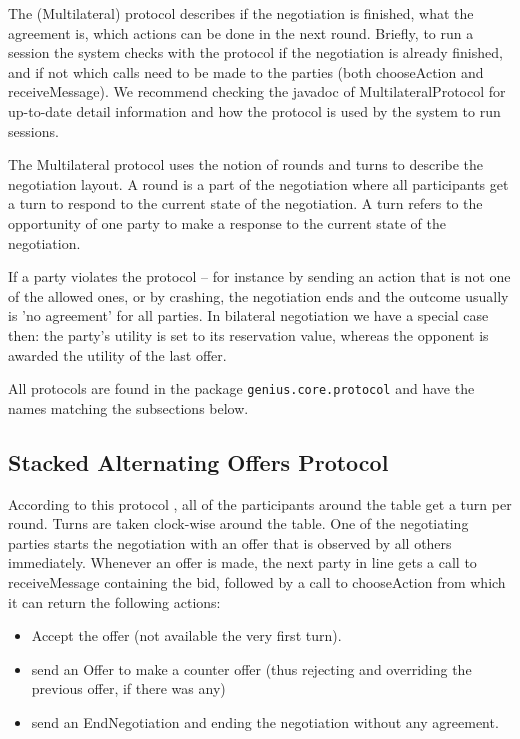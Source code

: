 \documentclass[]{article}
\begin{document}
  The (Multilateral)  protocol describes if the negotiation is finished, what the agreement is, which actions can be done in the next round.   Briefly, to run a session the system checks with the protocol if the negotiation is already finished,  and if not which calls need to be made to the parties (both chooseAction and receiveMessage).  We recommend checking the javadoc of MultilateralProtocol for up-to-date detail information and how the protocol is used by the system to run sessions.
  
 The Multilateral protocol uses the notion of rounds and turns to describe the negotiation layout. A round is a part of the negotiation where all participants get a turn to respond to the current state of the negotiation. A turn refers to the opportunity of one party to make a response to the current state of the negotiation. 
  
If a party violates the protocol -- for instance by sending an action that is not one of the allowed ones, or by crashing, the negotiation ends and the outcome usually is 'no agreement' for all parties.  In bilateral negotiation we have a special case then: the party's utility is set to its reservation value, whereas the opponent is awarded the utility of the last offer.

All protocols are found in the package \verb|genius.core.protocol| and have the names matching the subsections below.


\subsection{Stacked Alternating Offers Protocol}
According to this protocol \cite{MultilateralOffersProtocols} , all of the participants around the table get a turn per round. Turns are taken clock-wise around the table. One of the negotiating parties starts the negotiation with an offer that is observed by all others immediately. Whenever an offer is made, the next party in line gets a call to receiveMessage containing the bid, followed by a call to chooseAction from which it can return the following actions:
\begin{itemize}
\item Accept the offer (not available the very first turn). 
\item send an Offer to make a counter offer (thus rejecting and overriding the previous offer, if there was any) 
\item send an EndNegotiation and ending the negotiation without any agreement.
\end{itemize}
\end{document}
